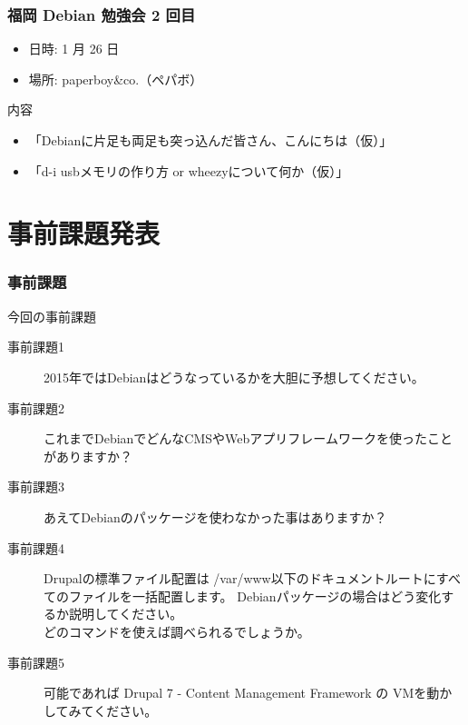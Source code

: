\documentclass[cjk,dvipdfmx,10pt,compress,%
hyperref={bookmarks=true,bookmarksnumbered=true,bookmarksopen=false,%
colorlinks=false,%
pdftitle={第 68 回 関西 Debian 勉強会},%
pdfauthor={倉敷・のがた・佐々木・かわだ},%
pdfsubject={資料},%
}]{beamer}
\begin{document}
\begin{frame}[fragile]
  \frametitle{福岡 Debian 勉強会 2 回目}
  \begin{itemize}
  \item 日時: 1 月 26 日
  \item 場所: paperboy\&co.（ペパボ）
  \end{itemize}
  \begin{block}{内容}
    \begin{itemize}
    \item 「Debianに片足も両足も突っ込んだ皆さん、こんにちは（仮）」
    \item 「d-i usbメモリの作り方 or wheezyについて何か（仮）」
    \end{itemize}
  \end{block}
\end{frame}




\section{事前課題発表}


\begin{frame}[fragile]
  \frametitle{事前課題}
  \begin{block}{今回の事前課題}
    \begin{description}
    \item[事前課題1] 2015年ではDebianはどうなっているかを大胆に予想してください。
    \item[事前課題2] これまでDebianでどんなCMSやWebアプリフレームワークを使ったことがありますか？
    \item[事前課題3] あえてDebianのパッケージを使わなかった事はありますか？
    \item[事前課題4] Drupalの標準ファイル配置は /var/www以下のドキュメントルートにすべてのファイルを一括配置します。
      Debianパッケージの場合はどう変化するか説明してください。\\
      どのコマンドを使えば調べられるでしょうか。
    \item[事前課題5] 可能であれば Drupal 7 - Content Management Framework の VMを動かしてみてください。
    \end{description}
  \end{block}
\end{frame}
\end{document}
